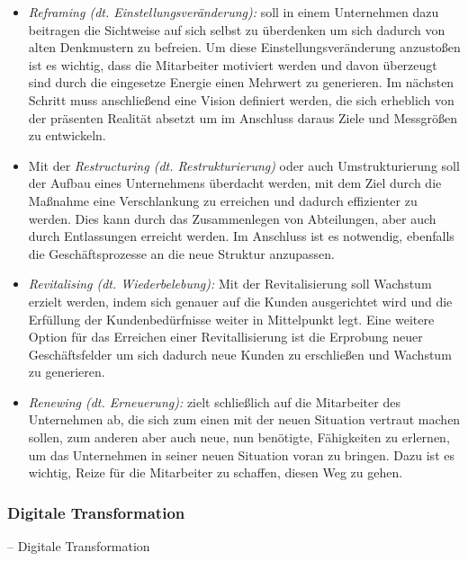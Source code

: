 \begin{itemize}
    \item[] \emph{Reframing (dt. Einstellungsveränderung):} soll in einem Unternehmen dazu beitragen die Sichtweise auf sich selbst zu überdenken um sich dadurch von alten Denkmustern zu befreien. Um diese Einstellungsveränderung anzustoßen ist es wichtig, dass die Mitarbeiter motiviert werden und davon überzeugt sind durch die eingesetze Energie einen Mehrwert zu generieren. Im nächsten Schritt muss anschließend eine Vision definiert werden, die sich erheblich von der präsenten Realität absetzt um im Anschluss daraus Ziele und Messgrößen zu entwickeln. 
    \item[] Mit der \emph{Restructuring (dt. Restrukturierung)} oder auch Umstrukturierung soll der Aufbau eines Unternehmens überdacht werden, mit dem Ziel durch die Maßnahme eine Verschlankung zu erreichen und dadurch effizienter zu werden. Dies kann durch das Zusammenlegen von Abteilungen, aber auch durch Entlassungen erreicht werden. Im Anschluss ist es notwendig, ebenfalls die Geschäftsprozesse an die neue Struktur anzupassen.   
    \item[] \emph{Revitalising (dt. Wiederbelebung):} Mit der Revitalisierung soll Wachstum erzielt werden, indem sich genauer auf die Kunden ausgerichtet wird und die Erfüllung der Kundenbedürfnisse weiter in Mittelpunkt legt. Eine weitere Option für das Erreichen einer Revitallisierung ist die Erprobung neuer Geschäftsfelder um sich dadurch neue Kunden zu erschließen und Wachstum zu generieren.
    \item[] \emph{Renewing (dt. Erneuerung):} zielt schließlich auf die Mitarbeiter des Unternehmen ab, die sich zum einen mit der neuen Situation vertraut machen sollen, zum anderen aber auch neue, nun benötigte, Fähigkeiten zu erlernen, um das Unternehmen in seiner neuen Situation voran zu bringen. Dazu ist es wichtig, Reize für die Mitarbeiter zu schaffen, diesen Weg zu gehen.
\end{itemize}

\subsubsection{Digitale Transformation}
-- Digitale Transformation

